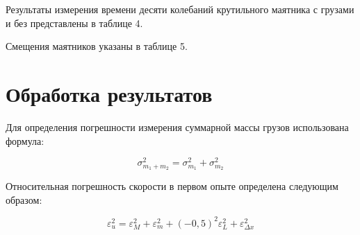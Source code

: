 \documentclass{article}
\begin{document}
Результаты измерения времени десяти колебаний крутильного маятника с грузами и без представлены в таблице 4.

\begin{table}[h!]
	\centering

	
\end{table}

Смещения маятников указаны в таблице 5.

\begin{table}[h!]
	\centering
\end{table}

\section*{Обработка результатов}

Для определения погрешности измерения суммарной массы грузов использована формула:

\begin{equation}
	\sigma_{m_1+m_2}^2 = \sigma_{m_1}^2 + \sigma_{m_2}^2
\end{equation}

Относительная погрешность скорости в первом опыте определена следующим образом:

\begin{equation}
	\varepsilon_{u}^2 = \varepsilon_{M}^2 + \varepsilon_{m}^2 + (-0,5)^{2}\varepsilon_{L}^2 + \varepsilon_{\Delta x}^2
\end{equation}
\end{document}
